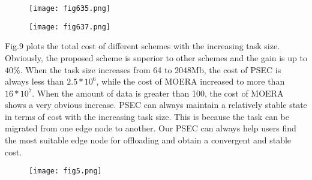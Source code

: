 \documentclass[journal,article,submit,pdftex,moreauthors]{Definitions/mdpi}
\begin{document}
\begin{figure}[htbp]
\centering
\begin{minipage}[t]{0.48\textwidth}
\centering
\texttt{[image: fig635.png]} 
\centering
\fontsize{6.5}{8}
\end{minipage}
\begin{minipage}[t]{0.48\textwidth}
\centering
\texttt{[image: fig637.png]} 
\centering
\fontsize{6.5}{8}

\end{minipage}
\fontsize{6.5}{8}
\end{figure}





Fig.9 plots the total cost of different schemes with the increasing task size.  Obviously, the proposed scheme  is superior to other schemes and the gain is up to $40\%$. When the task size increases from 64 to 2048Mb, the  cost of PSEC is always less than $2.5*10^6$, while the cost of MOERA increased to more than $16*10^7$.  When the amount of data is greater than 100, the cost of MOERA shows a very obvious increase. PSEC  can always maintain a relatively stable state in terms of cost with the increasing task size.  This is because the task can be migrated from one edge node to another. Our PSEC can always help users find the most suitable edge node  for offloading and obtain a convergent and stable cost.
\begin{figure}[H]
\centering
\texttt{[image: fig5.png]} 

 \centering
\fontsize{6.5}{8}
\end{figure}

\end{document}
